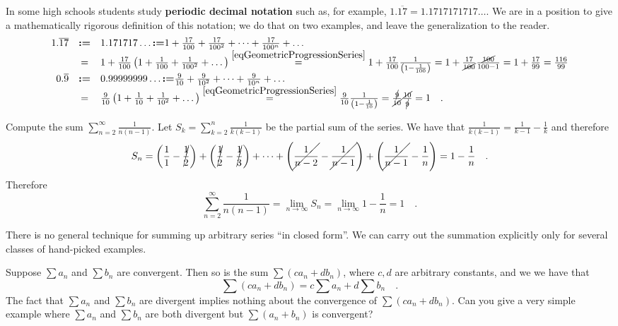 \documentclass[12pt]{book}
\newcommand{\eqdef}{\textbf{:=}}
\renewcommand{\emph}{\textbf}
\begin{document}
In some high schools students study \emph{periodic decimal notation} such as, for example, $1.\overline{17}= 1.1717171717\dots$. We are in a position to give a mathematically rigorous definition of this notation; we do that on two examples, and leave the generalization to the reader.
\[
\begin{array}{rcl}
1.\overline{17}&\eqdef&  1.171717\dots\eqdef 1+ \frac{17}{100}+ \frac{17}{100^2}+\dots +\frac{17}{100^n}+\dots\\
&=&1+\frac{17}{100}\left(1+\frac{1}{100}+\frac{1}{100^2}+\dots \right)\stackrel{\eqref{eqGeometricProgressionSeries}}{=} 1+\frac{17}{100}\frac{1}{\left(1-\frac{1}{100}\right)}=1+\frac{17}{\cancel{100}}\frac{\cancel{100}}{100-1}= 1+\frac{17}{99}= \frac{116}{99}\\
0.\overline{9}&\eqdef&  0.99999999\dots \eqdef \frac{9}{10}+ \frac{9}{10^2}+\dots +\frac{9}{10^n}+\dots\\
&=&\frac{9}{10}\left(1+\frac{1}{10}+\frac{1}{10^2}+\dots \right)\stackrel{\eqref{eqGeometricProgressionSeries}}{=} \frac{9}{10}\frac{1}{\left(1-\frac{1}{10}\right)}=\frac{\cancel{9}}{\cancel{10}}\frac{\cancel{10}}{\cancel{9}}= 1\quad .
\end{array}
\]

Compute the sum $\sum\limits_{n=2}^{\infty}\frac{1}{n(n-1)}$. Let $S_k= \sum \limits_{k=2}^{n} \frac{1}{k(k-1)}$ be the partial sum of the series. We have that $\frac{1}{k(k-1)}= \frac{1}{k-1}-\frac{1}k$ and therefore
\[
S_n= \left(\frac11-\cancel{ \frac12}\right)+ \left(\cancel{\frac12} -\cancel{ \frac13} \right) +\dots + \left(\cancel{\frac1{n-2}} -\cancel{\frac{1}{n-1}} \right)+ \left(\cancel{\frac1{n-1}}-\frac1n\right)
=1-\frac{1}n\quad .
\]
Therefore
\[
\sum\limits_{n=2}^{\infty}\frac{1}{n(n-1)}= \lim\limits_{n\to \infty} S_n = \lim \limits_{n \to \infty} 1-\frac{1}n=1\quad .
\]

There is no general technique for summing up arbitrary series ``in closed form''. We can carry out the summation explicitly only for several classes of hand-picked examples.


Suppose $\sum a_n$ and $\sum b_n$ are convergent. Then so is the sum $\sum (ca_n + db_n)$, where $c, d$ are arbitrary constants, and we we have that
\begin{equation}\label{eqLinearCombinationConvergentSeriesIsConvergent}
\sum (ca_n+db_n) = c\sum a_n +d\sum b_n\quad .
\end{equation}
The fact that $\sum a_n$ and $\sum b_n$ are divergent implies nothing about the convergence of $\sum (ca_n+db_n) $. Can you give a very simple example where $\sum a_n$ and $\sum b_n$  are both divergent but $ \sum (a_n+b_n)$ is convergent?
\end{document}

